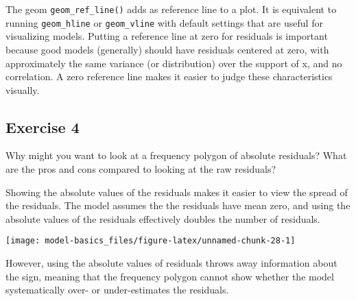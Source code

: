 \documentclass[]{book}
\newenvironment{Shaded}{\begin{snugshade}}{\end{snugshade}}
\newcommand{\DataTypeTok}[1]{\textcolor[rgb]{0.13,0.29,0.53}{#1}}
\newcommand{\FloatTok}[1]{\textcolor[rgb]{0.00,0.00,0.81}{#1}}
\newcommand{\KeywordTok}[1]{\textcolor[rgb]{0.13,0.29,0.53}{\textbf{#1}}}
\newcommand{\NormalTok}[1]{#1}
\newcommand{\OperatorTok}[1]{\textcolor[rgb]{0.81,0.36,0.00}{\textbf{#1}}}
\newcommand{\StringTok}[1]{\textcolor[rgb]{0.31,0.60,0.02}{#1}}
\theoremstyle{plain}
\theoremstyle{remark}
\theoremstyle{definition}
\theoremstyle{definition}
\theoremstyle{definition}
\theoremstyle{remark}
\begin{document}
The geom \texttt{geom\_ref\_line()} adds as reference line to a plot. It
is equivalent to running \texttt{geom\_hline} or \texttt{geom\_vline}
with default settings that are useful for visualizing models. Putting a
reference line at zero for residuals is important because good models
(generally) should have residuals centered at zero, with approximately
the same variance (or distribution) over the support of x, and no
correlation. A zero reference line makes it easier to judge these
characteristics visually.

\hypertarget{exercise-4-35}{%
\subsection{Exercise 4}\label{exercise-4-35}}

Why might you want to look at a frequency polygon of absolute residuals?
What are the pros and cons compared to looking at the raw residuals?

Showing the absolute values of the residuals makes it easier to view the
spread of the residuals. The model assumes the the residuals have mean
zero, and using the absolute values of the residuals effectively doubles
the number of residuals.

\begin{Shaded}
\end{Shaded}

\begin{center}\texttt{[image: model-basics\_files/figure-latex/unnamed-chunk-28-1]} \end{center}

However, using the absolute values of residuals throws away information
about the sign, meaning that the frequency polygon cannot show whether
the model systematically over- or under-estimates the residuals.
\end{document}

